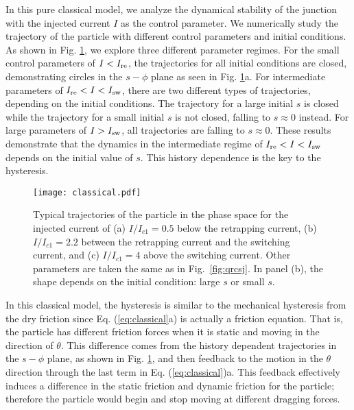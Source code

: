 \documentclass[aps,prl,twocolumn,showpacs,showpacs,10pt,superscriptaddress]{revtex4-1}
\begin{document}
In this pure classical model, we analyze the dynamical stability of the junction with the injected current $I$ as the control parameter. We numerically study the trajectory of the particle with different control parameters and initial conditions. As shown in Fig. \ref{fig:classical}, we explore three different parameter regimes. For the small control parameters of $I< I_{\rm re}$, the trajectories for all initial conditions are closed, demonstrating circles in the $s-\phi$ plane as seen in Fig. \ref{fig:classical}a. For intermediate parameters of $I_{\rm re}<I<I_{\rm sw}$, there are two different types of trajectories, depending on the initial conditions. The trajectory for a large initial $s$ is closed while the trajectory for a small initial $s$ is not closed, falling to $s \approx 0$ instead. For large parameters of $I> I_{\rm sw}$, all trajectories are falling to $s \approx 0$. These results demonstrate that the dynamics in the intermediate regime of $I_{\rm re} <I<I_{\rm sw}$ depends on the initial value of $s$. This history dependence is the key to the hysteresis.



\begin{figure}[t]
\begin{center}
\texttt{[image: classical.pdf]}
\caption{Typical trajectories of the particle in the phase space for the injected current of (a) $I/I_{c1} = 0.5$ below the retrapping current, (b) $I/I_{c1} = 2.2 $ between the retrapping current and the switching current, and (c) $I/I_{c1} = 4$ above the switching current. Other parameters are taken the same as in Fig.~\ref{fig:qrcsj}. In panel (b), the shape depends on the initial condition: large $s$ or small $s$.}
\label{fig:classical}
\end{center}
\end{figure}

In this classical model, the hysteresis is similar to the mechanical hysteresis from the dry friction \cite{wojewoda} since Eq. (\ref{eq:classical}a) is actually a friction equation. That is, the particle has different friction forces when it is static and moving in the direction of $\theta$. This difference comes from the history dependent trajectories in the $s-\phi$ plane, as shown in Fig. \ref{fig:classical}, and then feedback to the motion in the $\theta$ direction through the last term in Eq. (\ref{eq:classical})a. This feedback effectively induces a difference in the static friction and dynamic friction for the particle; therefore the particle would begin and stop moving at different dragging forces.
\end{document}
